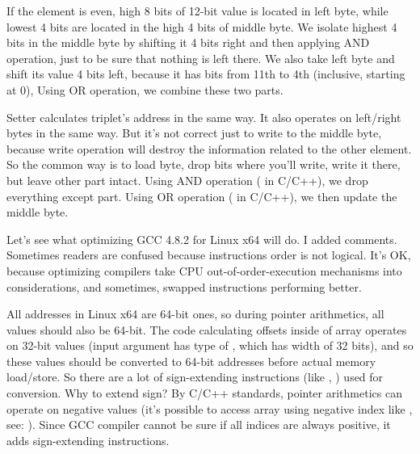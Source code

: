 If the element is even, high 8 bits of 12-bit value is located in left byte, while lowest 4 bits are located in the high 4 bits of middle byte.
We isolate highest 4 bits in the middle byte by shifting it 4 bits right and then applying AND operation, just to be sure that nothing is left there.
We also take left byte and shift its value 4 bits left, because it has bits from 11th to 4th (inclusive, starting at 0),
Using OR operation, we combine these two parts.


Setter calculates triplet's address in the same way.
It also operates on left/right bytes in the same way.
But it's not correct just to write to the middle byte, because write operation will destroy the information related to the other element.
So the common way is to load byte, drop bits where you'll write, write it there, but leave other part intact.
Using AND operation (\TT{\&} in C/C++), we drop everything except  part.
Using OR operation (\TT{|} in C/C++), we then update the middle byte.


Let's see what optimizing GCC 4.8.2 for Linux x64 will do.
I added comments.
Sometimes readers are confused because instructions order is not logical.
It's OK, because optimizing compilers take CPU out-of-order-execution mechanisms into considerations, and sometimes,
swapped instructions performing better.








All addresses in Linux x64 are 64-bit ones, so during pointer arithmetics, all values should also be 64-bit.
The code calculating offsets inside of array operates on 32-bit values (input  argument has type of , which has width of 32 bits),
and so these values should be converted to 64-bit addresses before actual memory load/store.
So there are a lot of sign-extending instructions (like , ) used for conversion.
Why to extend sign? By C/C++ standards, pointer arithmetics can operate on negative values 
(it's possible to access array using negative index like , see: ).
Since GCC compiler cannot be sure if all indices are always positive, it adds sign-extending instructions.

